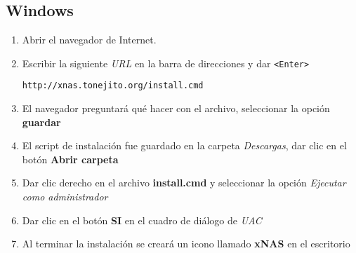       \subsection {Windows}
      \label{subsec:man-cert-windows}
{
\linespread{0.1}
\begin{enumerate}
  \item Abrir el navegador de Internet.


  \item Escribir la siguiente \textit{URL} en la barra de direcciones y dar \texttt{<Enter>}

    \texttt{http://xnas.tonejito.org/install.cmd}


  \item El navegador preguntar\'{a} qu\'{e} hacer con el archivo, seleccionar la opci\'{o}n \textbf{guardar}


  \item El script de instalaci\'{o}n fue guardado en la carpeta \textsl{Descargas}, dar clic en el bot\'{o}n \textbf{Abrir carpeta}


%

  \item Dar clic derecho en el archivo \textbf{install.cmd} y seleccionar la opci\'{o}n \textsl{Ejecutar como administrador}


  \item Dar clic en el bot\'{o}n \textbf{SI} en el cuadro de di\'{a}logo de \textit{UAC}


%

  \item Al terminar la instalaci\'{o}n se crear\'{a} un icono llamado \textbf{xNAS} en el escritorio


\end{enumerate}
}

